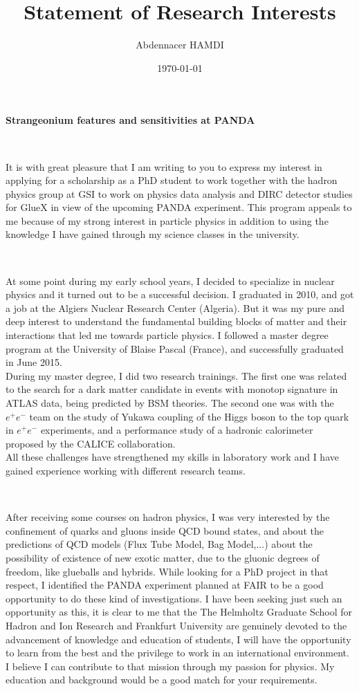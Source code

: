 \documentclass[a4paper,roman]{article}
\title{Statement of Research Interests}
\author{Abdennacer HAMDI}
\date{\today}
\begin{document}
\fontsize{11}{12}
\selectfont
\maketitle

{\bfseries Strangeonium features and sensitivities at PANDA}

~\par It is with great pleasure that I am writing to you to express my interest in applying for a scholarship as a PhD student to work together with the hadron physics group at GSI to work on physics data analysis and DIRC detector studies for GlueX in view of the upcoming PANDA experiment. This program appeals to me because of my strong interest in particle physics in addition to using the knowledge I have gained through my science classes in the university.

~\par At some point during my early school years, I decided to specialize in nuclear physics and it turned out to be a successful decision. I graduated in 2010, and got a job at the Algiers Nuclear Research Center (Algeria). But it was my pure and deep interest to understand the fundamental building blocks of matter and their interactions that led me towards particle physics. I followed a master degree program at the University of Blaise Pascal (France), and successfully graduated in June 2015.\\
During my master degree, I did two research trainings. The first one was related to the search for a dark matter candidate in events with monotop signature in ATLAS data, being predicted by BSM theories. The second one was with the $e^+e^-$ team on the study of Yukawa coupling of the Higgs boson to the top quark in $e^+e^-$ experiments, and a performance study of a hadronic calorimeter proposed by the CALICE collaboration.\\
All these challenges have strengthened my skills in laboratory work and I have gained experience working with different research teams.

~\par After receiving some courses on hadron physics, I was very interested by the confinement of quarks and gluons inside QCD bound states, and about the predictions of QCD models (Flux Tube Model, Bag Model,...) about the possibility of existence of new exotic matter, due to the gluonic degrees of freedom, like glueballs and hybrids. While looking for a PhD project in that respect, I identified the PANDA experiment planned at FAIR to be a good opportunity to do these kind of investigations. I have been seeking just such an opportunity as this, it is clear to me that the The Helmholtz Graduate School for Hadron and Ion Research and Frankfurt University are genuinely devoted to the advancement of knowledge and education of students, I will have the opportunity to learn from the best and the privilege to work in an international environment. I believe I can contribute to that mission through my passion for physics. My education and background would be a good match for your requirements.
\end{document}
